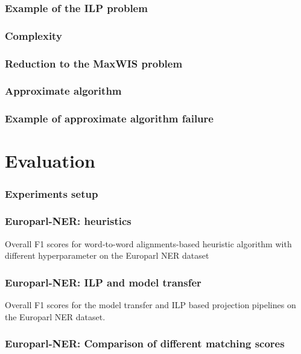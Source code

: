 \documentclass{beamer}
\begin{document}
\begin{frame}
  \frametitle{Example of the ILP problem}
\end{frame}

\begin{frame}
  \frametitle{Complexity}
\end{frame}

\begin{frame}
  \frametitle{Reduction to the MaxWIS problem}
\end{frame}

\begin{frame}
  \frametitle{Approximate algorithm}
\end{frame}

\begin{frame}
  \frametitle{Example of approximate algorithm failure}
\end{frame}

\section{Evaluation}

\begin{frame}
  \frametitle{Experiments setup}
\end{frame}

\begin{frame}
  \frametitle{Europarl-NER: heuristics}

  \begin{table}[ht]
    \centering
    \scalebox{0.75}{
      
    }
    \caption{Overall F1 scores for word-to-word alignments-based heuristic
    algorithm with different hyperparameter  on the Europarl NER dataset}
    \label{tab:europarl_heur_f1}
  \end{table}
\end{frame}

\begin{frame}
  \frametitle{Europarl-NER: ILP and model transfer}

  \begin{table}[t]
    \centering
    \scalebox{0.76}{
      
    }
    \caption{Overall F1 scores for the model transfer and ILP based projection pipelines
    on the Europarl NER dataset.}
    \label{tab:europarl_ilp_f1}
  \end{table}
\end{frame}

\begin{frame}
  \frametitle{Europarl-NER: Comparison of different matching scores}
\end{frame}
\end{document}
